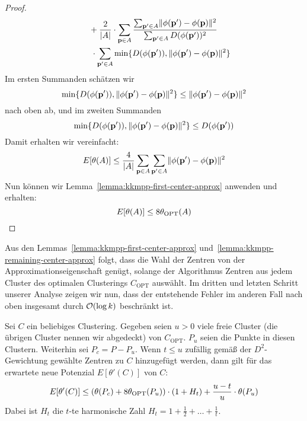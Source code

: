 \begin{proof}
\begin{align*}
						& \; \; \; \; \; + \frac{2}{\left|A\right|} \cdot
							\sum_{\mathbf{p} \in A} \frac{\sum_{\mathbf{p}' \in A} \lVert {\phi(\ensuremath{\mathbf{p}}')} - {\phi(\mathbf{p})} \rVert^2}{\sum_{\mathbf{p}' \in A} D(\phi(\mathbf{p}'))^2} \\
						& \; \; \; \; \; \; \cdot \sum_{\mathbf{p}' \in A} \min \{ D(\phi(\mathbf{p}')), \lVert {\phi(\ensuremath{\mathbf{p}}')} - {\phi(\mathbf{p})} \rVert^2 \}
	\end{align*}
	Im ersten Summanden schätzen wir
	\[ \min \{ D(\phi(\mathbf{p}')), \lVert {\phi(\ensuremath{\mathbf{p}}')} - {\phi(\mathbf{p})} \rVert^2 \} \leq \lVert {\phi(\ensuremath{\mathbf{p}}')} - {\phi(\mathbf{p})} \rVert^2 \]
	nach oben ab, und im zweiten Summanden
	\[ \min \{ D(\phi(\mathbf{p}')), \lVert {\phi(\ensuremath{\mathbf{p}}')} - {\phi(\mathbf{p})} \rVert^2 \} \leq D(\phi(\mathbf{p}')) \]
	Damit erhalten wir vereinfacht:
	\[ E[\theta(A)] \leq \frac{4}{\left|A\right|} \sum_{\mathbf{p} \in A} \sum_{\mathbf{p}' \in A} \lVert {\phi(\ensuremath{\mathbf{p}}')} - {\phi(\mathbf{p})} \rVert^2 \]
	Nun können wir Lemma~\ref{lemma:kkmpp-first-center-approx} anwenden und erhalten:
	\[ E[\theta(A)] \leq 8 \theta_{\textrm{OPT}}(A) \]
\end{proof}
Aus den Lemmas~\ref{lemma:kkmpp-first-center-approx} und~\ref{lemma:kkmpp-remaining-center-approx} folgt, dass
die Wahl der Zentren von \kkmpp{} der Approximationseigenschaft genügt, solange der Algorithmus Zentren aus jedem Cluster
des optimalen Clusterings $C_\textrm{OPT}$ auswählt. Im dritten und letzten Schritt unserer Analyse zeigen wir nun,
dass der entstehende Fehler im anderen Fall nach oben insgesamt durch $\mathcal{O}(\log k)$ beschränkt ist.

\begin{lemma}
\label{lemma:kkmpp-error}
	Sei $C$ ein beliebiges Clustering. Gegeben seien $u > 0$ viele freie Cluster (die übrigen Cluster nennen wir abgedeckt)
	von $C_\textrm{OPT}$. $P_u$ seien die Punkte in
	diesen Clustern. Weiterhin sei $P_c = P - P_u$. Wenn $t \leq u$ zufällig gemäß der $D^2$-Gewichtung gewählte Zentren zu
	$C$ hinzugefügt werden, dann gilt für das erwartete neue Potenzial $E[\theta'(C)]$ von $C$:
	\[ E[\theta'(C)] \leq \left( \theta(P_c) + 8 \theta_{\textrm{OPT}}(P_u) \right) \cdot (1 + H_t) + \frac{u-t}{u} \cdot \theta(P_u) \]
	Dabei ist $H_t$ die $t$-te harmonische Zahl $H_t = 1 + \frac{1}{2} + \dots + \frac{1}{t}$.
\end{lemma}

